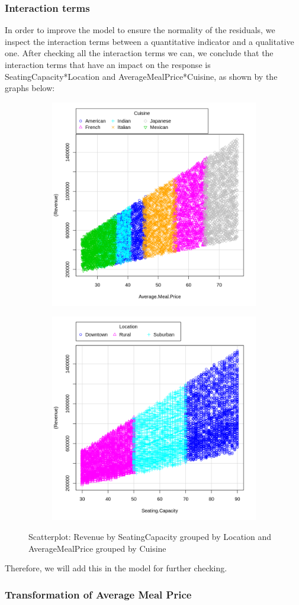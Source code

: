 \subsubsection{Interaction terms}
In order to improve the model to ensure the normality of the residuals, we inspect the interaction terms between a quantitative indicator and a qualitative one. After checking all the interaction terms we can, we conclude that the interaction terms that have an impact on the response is SeatingCapacity*Location and AverageMealPrice*Cuisine, as shown by the graphs below:
\begin{figure}[H]
\centering
\begin{subfigure}{.5\textwidth}
  \centering
  \includegraphics[width=.4\linewidth]{img/revByMealGroupCuisine.png}
\end{subfigure}%
\begin{subfigure}{.5\textwidth}
  \centering
  \includegraphics[width=.4\linewidth]{img/revBySeatGroupLocation.png}
\end{subfigure}
\caption{Scatterplot: Revenue by SeatingCapacity grouped by Location and AverageMealPrice grouped by Cuisine}
\label{fig:scaled_revenue_distribution_seatingcapacity_location}
\end{figure}
Therefore, we will add this in the model for further checking.

\subsubsection{Transformation of Average Meal Price}

